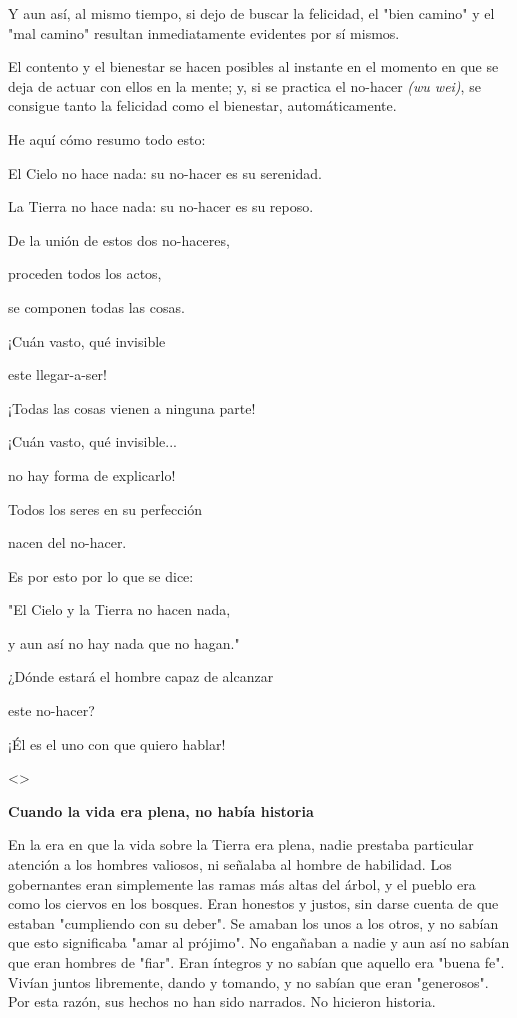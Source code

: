 Y aun así, al mismo tiempo, si dejo de buscar la felicidad, el "bien
camino" y el "mal camino" resultan inmediatamente evidentes por sí
mismos.

El contento y el bienestar se hacen posibles al instante en el momento
en que se deja de actuar con ellos en la mente; y, si se practica el
no-hacer \emph{(wu wei)}, se consigue tanto la felicidad como el
bienestar, automáticamente.

He aquí cómo resumo todo esto:

El Cielo no hace nada: su no-hacer es su serenidad.

La Tierra no hace nada: su no-hacer es su reposo.

De la unión de estos dos no-haceres,

proceden todos los actos,

se componen todas las cosas.

¡Cuán vasto, qué invisible

este llegar-a-ser!

¡Todas las cosas vienen a ninguna parte!

¡Cuán vasto, qué invisible...

no hay forma de explicarlo!

Todos los seres en su perfección

nacen del no-hacer.

Es por esto por lo que se dice:

"El Cielo y la Tierra no hacen nada,

y aun así no hay nada que no hagan."

¿Dónde estará el hombre capaz de alcanzar

este no-hacer?

¡Él es el uno con que quiero hablar!

\textless\textgreater{}

\textbf{{Cuando la vida era plena, no había historia}}

En la era en que la vida sobre la Tierra era plena, nadie prestaba
particular atención a los hombres valiosos, ni señalaba al hombre de
habilidad. Los gobernantes eran simplemente las ramas más altas del
árbol, y el pueblo era como los ciervos en los bosques. Eran honestos y
justos, sin darse cuenta de que estaban "cumpliendo con su deber". Se
amaban los unos a los otros, y no sabían que esto significaba "amar al
prójimo". No engañaban a nadie y aun así no sabían que eran hombres de
"fiar". Eran íntegros y no sabían que aquello era "buena fe". Vivían
juntos libremente, dando y tomando, y no sabían que eran "generosos".
Por esta razón, sus hechos no han sido narrados. No hicieron historia.

